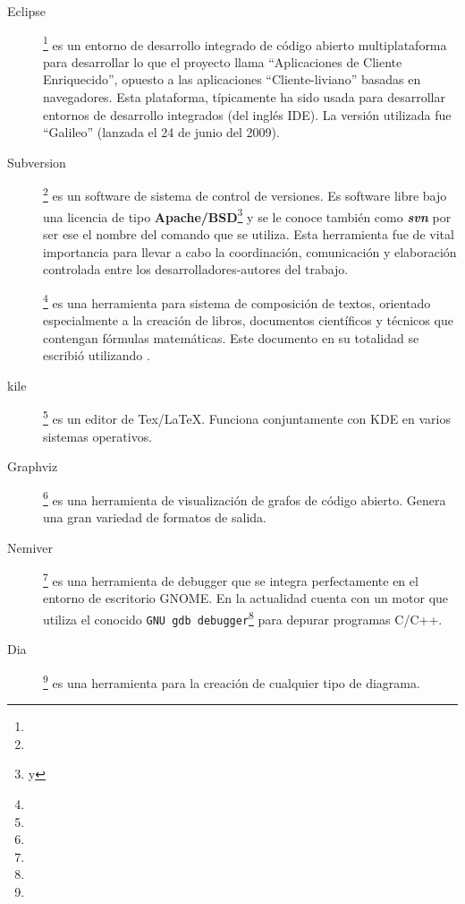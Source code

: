 \begin{description}
\item [Eclipse]\footnote{} es un entorno de desarrollo integrado de código abierto multiplataforma para desarrollar lo que el proyecto llama ``Aplicaciones de Cliente Enriquecido'', opuesto a las aplicaciones ``Cliente-liviano'' basadas en navegadores. Esta plataforma, típicamente ha sido usada para desarrollar entornos de desarrollo integrados (del inglés IDE). La versión utilizada fue ``Galileo'' (lanzada el 24 de junio del 2009).

\item [Subversion]\footnote{} es un software de sistema de control de versiones. Es software libre bajo una licencia de tipo \textbf{Apache/BSD}\footnote{ y } y se le conoce también como \textit{\textbf{svn}} por ser ese el nombre del comando que se utiliza. Esta herramienta fue de vital importancia para llevar a cabo la coordinación, comunicación y elaboración controlada entre los desarrolladores-autores del trabajo.

\item [\LaTeXe]\footnote{} es una herramienta para sistema de composición de textos, orientado especialmente a la creación de libros, documentos científicos y técnicos que contengan fórmulas matemáticas. Este documento en su totalidad se escribió utilizando \LaTeXe.

\item [kile]\footnote{} es un editor de Tex/LaTeX. Funciona conjuntamente con KDE en varios sistemas operativos.

\item [Graphviz]\footnote{} es una herramienta de visualización de grafos de código abierto. Genera una gran variedad de formatos de salida.

\item [Nemiver]\footnote{} es una herramienta de debugger que se integra perfectamente en el entorno de escritorio GNOME. En la actualidad cuenta con un motor que utiliza el conocido \texttt{GNU gdb debugger}\footnote{} para depurar programas C/C++.

\item [Dia]\footnote{} es una herramienta para la creación de cualquier tipo de diagrama.


\end{description}
